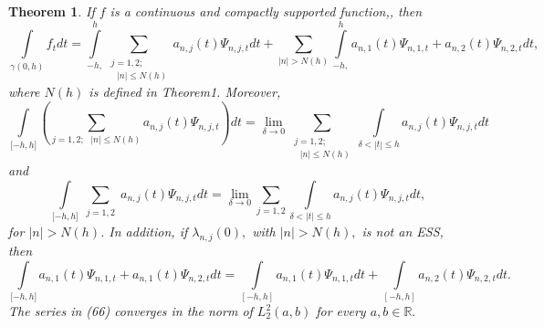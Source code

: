 \documentclass{article}%
\newtheorem{theorem}{Theorem}
{}
\begin{document}
\begin{theorem}
If $f$ is a continuous and compactly supported function,, then
\begin{equation}
\int\limits_{\gamma(0,h)}f_{t}dt=\int\limits_{-h,}^{h}%
{\textstyle\sum_{\substack{j=1,2;\\\text{ }\left\vert n\right\vert \leq
N(h)}}}
a_{n,j}(t)\Psi_{n,j,t}dt+\sum_{\left\vert n\right\vert >N(h)}\int
\limits_{-h,}^{h}a_{n,1}(t)\Psi_{n,1,t}+a_{n,2}(t)\Psi_{n,2,t}dt, \tag{66}%
\end{equation}
where $N(h)$ is defined in Theorem1. Moreover,%
\begin{equation}
\int\limits_{\lbrack-h,h]}\left(  \sum_{j=1,2;\text{ }\left\vert n\right\vert
\leq N(h)}a_{n,j}(t)\Psi_{n,j,t}\right)  dt=\lim_{\delta\rightarrow0}%
\sum_{\substack{j=1,2;\\\text{ }\left\vert n\right\vert \leq N(h)}%
}\int\limits_{\delta<\left\vert t\right\vert \leq h}a_{n,j}(t)\Psi_{n,j,t}dt
\tag{67}%
\end{equation}
and%
\begin{equation}
\int\limits_{\lbrack-h,h]}%
{\textstyle\sum_{\substack{j=1,2\\\text{ }}}}
a_{n,j}(t)\Psi_{n,j,t}dt=\lim_{\delta\rightarrow0}%
{\textstyle\sum_{j=1,2}}
\int\limits_{\delta<\left\vert t\right\vert \leq h}a_{n,j}(t)\Psi_{n,j,t}dt,
\tag{68}%
\end{equation}
for $\left\vert n\right\vert >N(h)$. In addition, if $\lambda_{n,j}(0),$ with
$\left\vert n\right\vert >N(h),$ is not an ESS, then
\begin{equation}
\int\limits_{\lbrack-h,h]}a_{n,1}(t)\Psi_{n,1,t}+a_{n,1}(t)\Psi_{n,2,t}%
dt=\int\limits_{[-h,h]}a_{n,1}(t)\Psi_{n,1,t}dt+\int\limits_{[-h,h]}%
a_{n,2}(t)\Psi_{n,2,t}dt. \tag{69}%
\end{equation}
The series in (66) converges in the norm of $L_{2}^{2}(a,b)$ for every
$a,b\in\mathbb{R}.$
\end{theorem}
\end{document}
